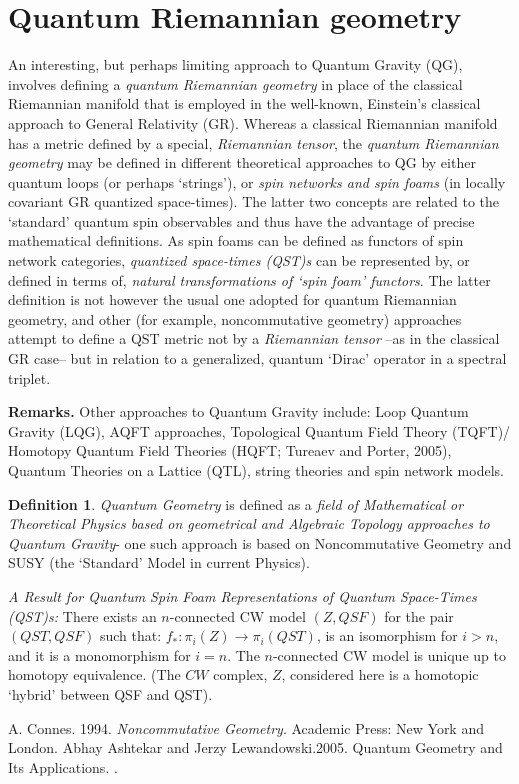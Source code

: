 \documentclass[12pt]{article}
\theoremstyle{plain}
\theoremstyle{definition}
\newtheorem{definition}{Definition}[section]
\numberwithin{equation}{section}
\begin{document}
\section{Quantum Riemannian geometry}

An interesting, but perhaps limiting approach to Quantum Gravity (QG), involves defining a \emph{quantum Riemannian geometry} \cite{AL2k5} in place of the classical Riemannian manifold that is employed in the well-known, Einstein's classical approach to General Relativity (GR). Whereas a classical Riemannian manifold has a
metric defined by a special, \emph{Riemannian tensor}, the \emph{quantum Riemannian geometry} may be defined in different theoretical approaches to QG by either quantum loops (or perhaps `strings'), or  \emph{spin networks and spin foams} (in locally covariant GR quantized space-times). The latter two concepts are related to the `standard' quantum spin observables and thus have the advantage of precise mathematical definitions. As spin foams can be defined as functors of spin network categories, \emph{quantized space-times (QST)s} can be represented by, or defined in terms of, \emph{natural transformations of `spin foam' functors}.  The latter definition is not however the usual one adopted for quantum Riemannian geometry, and other (for example, noncommutative geometry) approaches attempt to define a QST metric not by a \emph{Riemannian tensor} --as in the classical GR case-- but in relation to a generalized, quantum `Dirac' operator in a spectral triplet. 

\textbf{Remarks.}
Other approaches to Quantum Gravity include: Loop Quantum Gravity (LQG), AQFT approaches,
Topological Quantum Field Theory (TQFT)/ Homotopy Quantum Field Theories (HQFT; Tureaev and Porter, 2005),
Quantum Theories on a Lattice (QTL), string theories and spin network models. 

\begin{definition}
\emph{Quantum Geometry} is defined as a \emph{field of Mathematical or Theoretical Physics based on geometrical and Algebraic Topology approaches to Quantum Gravity}- one such approach is based on Noncommutative Geometry and SUSY (the `Standard' Model in current Physics).
\end{definition}

\emph{A Result for Quantum Spin Foam Representations of Quantum Space-Times (QST)s:}
There exists an $n$-connected CW model $(Z,QSF)$ for the pair $(QST,QSF)$ such that: 
$f_*: \pi_i(Z) \rightarrow \pi_i (QST)$, is an isomorphism for $i>n$, and it is a monomorphism for $i=n$. 
The $n$-connected CW model is unique up to homotopy equivalence. (The $CW$ complex, $Z$, considered here is a homotopic `hybrid' between QSF and QST).

\begin{thebibliography}{9}
A. Connes. 1994. \emph{Noncommutative Geometry}. Academic Press: New York and London.  
Abhay Ashtekar and Jerzy Lewandowski.2005. Quantum Geometry and Its Applications. 
.
\end{thebibliography}
\end{document}
